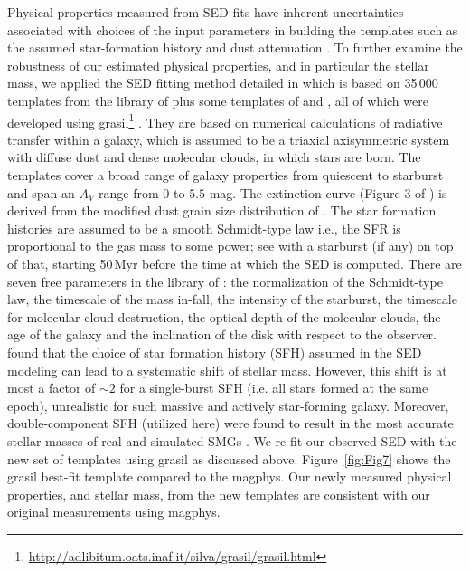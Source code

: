 \documentclass[iop,apj,useAMS,usenatbib]{emulateapj-rtx4}
\begin{document}
Physical properties measured from SED fits have inherent
  uncertainties associated with choices of the input parameters in
  building the templates such as the assumed star-formation history
  and dust attenuation \citep{Conroy2013}. To further examine the robustness of our estimated physical
  properties, and in particular the stellar mass, we applied the SED fitting method detailed in
  \citet{michalowski08, michalowski09, michalowski10smg,
    michalowski10smg4, michalowski12mass, michalowski14mass}
  which is based on 35\,000 templates from the library of
\citet{iglesias07} plus some templates of \citet{silva98} and
\citet{michalowski08}, all of which were developed using
{\sc grasil}\footnote{\url{http://adlibitum.oats.inaf.it/silva/grasil/grasil.html}}
\citep{silva98}. They are based on numerical calculations of radiative
transfer within a galaxy, which is assumed to be a triaxial
axisymmetric system with diffuse dust and dense molecular clouds, in
which stars are born. The templates cover a broad range of galaxy properties from quiescent
to starburst and span an $A_V$ range from $0$ to $5.5$ mag. The
extinction curve (Figure 3 of \citealp{silva98}) is derived from the
modified dust grain size distribution of \citet{draine84}.
The star formation histories are assumed to be a smooth Schmidt-type
law i.e., the SFR is proportional to the gas mass to some
power; see \citep{silva98} with a starburst (if any) on top of
that, starting 50\,Myr before the time at which the SED is computed.
There are seven free parameters in the library of \citet{iglesias07}:
the normalization of the Schmidt-type law, the timescale of the mass
in-fall, the intensity of the starburst, the timescale for molecular
cloud destruction, the optical depth of the molecular clouds, the age
of the galaxy and the inclination of the disk with respect to the
observer. \citet{Michalowski2012, michalowski14mass} found that the choice of star
formation history (SFH) assumed in the SED modeling can lead to a
systematic shift of stellar mass. However, this shift is at most a
factor of $\sim2$ for a single-burst SFH (i.e. all stars formed at the
same epoch), unrealistic for such massive and actively star-forming
galaxy. Moreover, double-component SFH (utilized here) were found to
result in the most accurate stellar masses of real
\citep{Michalowski2012} and simulated SMGs
\citep{michalowski14mass, Hayward15}. We re-fit our observed SED with
the new set of templates using {\sc grasil} as discussed
above. Figure~\ref{fig:Fig7} shows the {\sc grasil} best-fit
template compared to the {\sc magphys}. Our newly measured physical
properties, and stellar mass, from the new templates are consistent
with our original measurements using {\sc magphys}.
\end{document}
